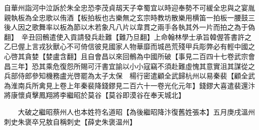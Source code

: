 自華州詣河中泣訴於朱全忠恐李茂貞刼天子幸蜀宜以時迎奉勢不可緩全忠與之宴胤親執板為全忠歌以侑酒【板拍板也古樂無之玄宗時教坊散樂用横笛一拍板一腰鼓三後人因之歌舞率以板為節以木若象凡八片以韋貫之兩手各執其外一片而拍之為于偽翻】　辛丑回鶻遣使入貢請發兵赴難【難乃旦翻】上命翰林學士承旨韓偓答書許之乙巳偓上言戎狄獸心不可倚信彼見國家人物華靡而城邑荒殘甲兵彫弊必有輕中國之心啓其貪婪【婪盧含翻】且自會昌以來回鶻為中國所破【事見二百四十七卷武宗會昌三年】恐其乘危復怨所賜可汗書宜諭以小小寇竊不須赴難虛愧其意實沮其謀從之兵部侍郎參知機務盧光啓罷為太子太保　楊行密遣顧全武歸杭州以易秦裴【顧全武為淮南兵所禽見上卷上年秦裴降錢鏐見二百六十一卷光化元年】錢鏐大喜遣裴還汴將康懷貞擊鳳翔將李繼昭於莫谷【莫谷即漠谷在奉天城北】

　　大破之繼昭蔡州人也本姓符名道昭【為後繼昭降汴復舊姓張本】五月庚戌溫州刺史朱褒卒兄敖自稱刺史【薛史朱褒温州】

